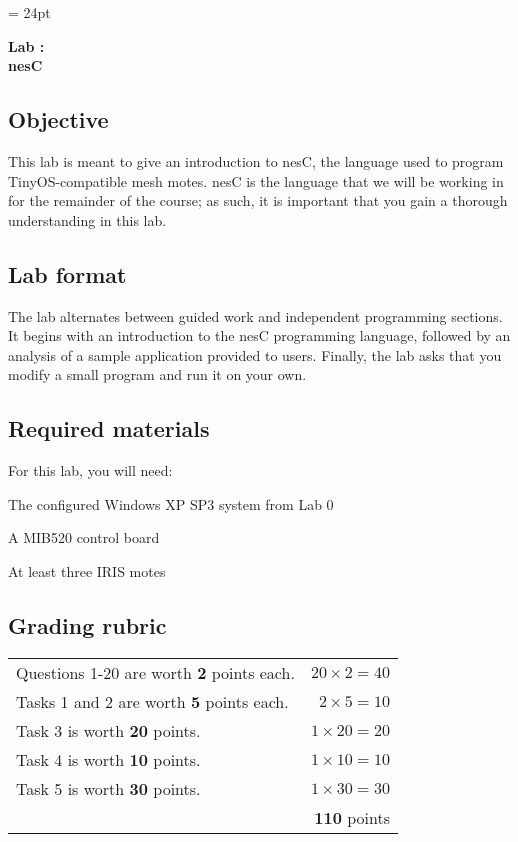 \documentclass{article}
\begin{document}
\chead{\textcolor{Gray}{CSSE491 -- Mesh Networking Lab Assignment}}
\headsep = 24pt

\begin{center}
{ \large
\textbf{Lab \labnumber: \longproductname} \\
\textbf{nesC}
}
\end{center}

\subsection*{Objective}
This lab is meant to give an introduction to nesC, the language used to program TinyOS-compatible mesh motes. nesC is the language that we will be working in for the remainder of the course; as such, it is important that you gain a thorough understanding in this lab.

\subsection*{Lab format}
The lab alternates between guided work and independent programming sections. It begins with an introduction to the nesC programming language, followed by an analysis of a sample application provided to users. Finally, the lab asks that you modify a small program and run it on your own.

\subsection*{Required materials}
For this lab, you will need:

\begin{itemize*}
\item The configured Windows XP SP3 system from Lab 0
\item A MIB520 control board
\item At least three IRIS motes
\end{itemize*}

\subsection*{Grading rubric}
\begin{tabular}{p{5.5in} r}
Questions 1-20 are worth \textbf{2} points each. & $20 \times 2 = 40$ \\
Tasks 1 and 2 are worth \textbf{5} points each. & $2 \times 5 = 10$ \\
Task 3 is worth \textbf{20} points. & $1 \times 20 = 20$ \\
Task 4 is worth \textbf{10} points. & $1 \times 10 = 10$ \\
Task 5 is worth \textbf{30} points. & $1 \times 30 = 30$ \\ \hline
& \textbf{110} points
\end{tabular}
\end{document}
